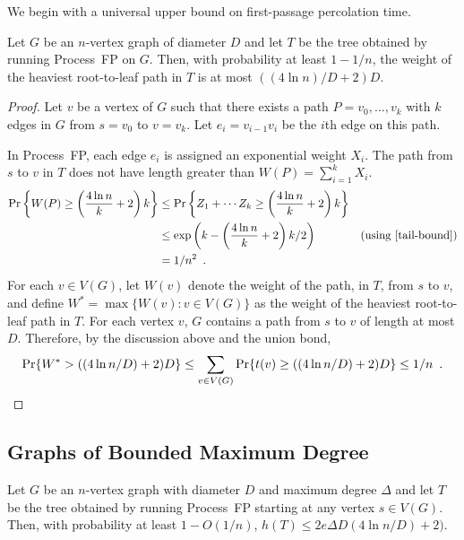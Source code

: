 \documentclass[lotsofwhite]{patmorin}
\begin{document}
We begin with a universal upper bound on first-passage percolation time.

\begin{lem}
  Let $G$ be an $n$-vertex graph of diameter $D$ and let $T$ be the
  tree obtained by running Process~FP on $G$.  Then, with probability
  at least $1-1/n$, the weight of the heaviest root-to-leaf path in $T$
  is at most $((4\ln n)/D+2)D$.
\end{lem}

\begin{proof}
  Let $v$ be a vertex of $G$ such that there exists a path
  $P=v_0,\ldots,v_k$ with $k$ edges in $G$ from $s=v_0$ to $v=v_k$.
  Let $e_i=v_{i-1}v_i$ be the $i$th edge on this path.

  In Process~FP, each edge $e_i$ is assigned an exponential weight $X_i$.
  The path from $s$ to $v$ in $T$ does not have length greater than
  $W(P)=\sum_{i=1}^k X_i$.
  \begin{align*}
      \Pr\left\{W(P)\ge \left(\frac{4\ln n}{k}+2\right)k\right\} 
        & \le \Pr\left\{Z_1+\cdots Z_k\ge \left(\frac{4\ln n}{k}+2\right)k\right\} \\ 
        & \le \exp\left(k - \left(\frac{4\ln n}{k}+2\right)k/2\right) 
            & \text{(using \eqref{tail-bound})} \\
      & = 1/n^2 \enspace .
  \end{align*}
  For each $v\in V(G)$, let $W(v)$ denote the weight of the path, in
  $T$, from $s$ to $v$, and define $W^*=\max\{W(v):v\in V(G)\}$  as the
  weight of the heaviest root-to-leaf path in $T$.  For each vertex $v$,
  $G$ contains a path from $s$ to $v$ of length at most $D$. Therefore,
  by the discussion above and the union bond,
  \[
      \Pr\{W^*> ((4\ln n/D)+2)D\} 
          \le \sum_{v\in V(G)}\Pr\{t(v) \ge ((4\ln n/D)+2)D\}     
       \le 1/n \enspace . \qedhere
  \]
\end{proof}

\subsection{Graphs of Bounded Maximum Degree}

\begin{thm}
  Let $G$ be an $n$-vertex graph with diameter $D$ and maximum degree $\Delta$
  and let $T$ be the tree obtained by running Process~FP starting at
  any vertex $s\in V(G)$.  Then, with probability at least $1-O(1/n)$,
  $h(T)\le 2e\Delta D(4\ln n/D)+2)$.
\end{thm}
\end{document}
